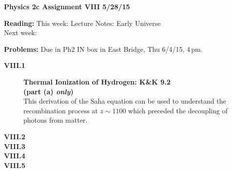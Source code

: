 \documentclass[11pt]{article}
\begin{document}
%
\centerline{\large\bf Physics 2c \hfill Assignment VIII \hfill  5/28/15}

\medskip
\begin{list}{}{\leftmargin 2.4cm  .2cm }
\item[{\bf Reading:}  \hfill ] This week: Lecture Notes: Early Universe \\
                               Next week: 
\item[{\bf Problems:} \hfill ] Due in Ph2 IN box in East Bridge, Thu 6/4/15, 4\,pm.
\end{list}

\begin{description}

\item[{\bf VIII.1} ] {\bf Thermal Ionization of Hydrogen: K\&K 9.2} \\
\textbf{(part (a) \emph{only})}\\
This derivation of the Saha equation can be used to understand the
recombination process at $z \sim 1100$ which preceded the decoupling
of photons from matter.

\item[{\bf VIII.2} ]

\item[{\bf VIII.3} ]

\item[{\bf VIII.4} ]

\item[{\bf VIII.5} ]

\end{description}
\end{document}
